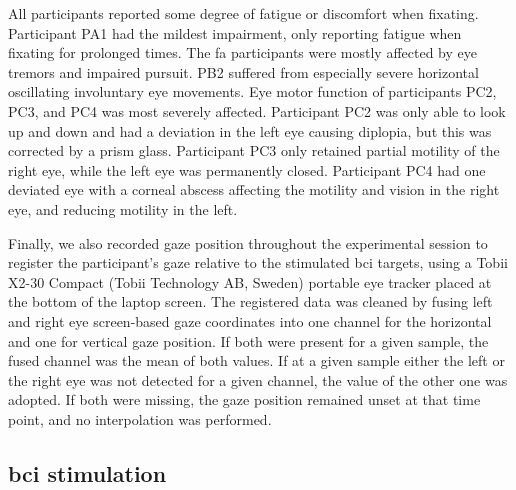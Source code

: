 \documentclass{article}
\begin{document}
All participants reported some degree of fatigue or discomfort when fixating.
Participant PA1 had the mildest impairment, only reporting fatigue when fixating
for prolonged times.
The \ac{fa} participants were mostly affected by eye tremors and impaired pursuit.
PB2 suffered from especially severe horizontal oscillating involuntary eye
movements.
Eye motor function of participants PC2, PC3, and PC4 was most severely affected.
Participant PC2 was only able to look up and down and had a deviation in the
left eye causing diplopia, but this was corrected by a prism glass.
Participant PC3 only retained partial motility of the right eye, while the left eye was permanently closed.
Participant PC4 had one deviated eye with a corneal abscess affecting the motility
and vision in the right eye, and reducing motility in the left.

Finally, we also recorded gaze position throughout the experimental session to
register the participant's gaze relative to the stimulated \ac{bci} targets,
using a Tobii X2-30 Compact (Tobii
Technology AB, Sweden) portable eye tracker placed at the bottom of the laptop screen.
The registered data was cleaned by fusing left and right eye screen-based gaze
coordinates into one channel for the horizontal and one for vertical gaze position.
If both were present for a given sample, the fused channel was the mean of both
values.
If at a given sample either the left or the right eye was not detected for a
given channel, the value of the other one was adopted.
If both were missing, the gaze position remained unset at that time point, and no
interpolation was performed.



\subsection{\Acs{bci} stimulation}
\end{document}
